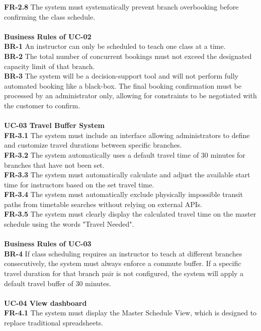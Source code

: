 \textbf{FR-2.8} The system must systematically prevent branch overbooking before confirming the class schedule. \\
\\
\textbf{Business Rules of UC-02} \\
\textbf{BR-1} An instructor can only be scheduled to teach one class at a time. \\
\textbf{BR-2} The total number of concurrent bookings must not exceed the designated capacity limit of that branch. \\
\textbf{BR-3} The system will be a decision-support tool and will not perform fully automated booking like a black-box. The final booking confirmation must be processed by an administrator only, allowing for constraints to be negotiated with the customer to confirm. \\
\\
\textbf{UC-03 Travel Buffer System} \\
\textbf{FR-3.1} The system must include an interface allowing administrators to define and customize travel durations between specific branches. \\
\textbf{FR-3.2} The system automatically uses a default travel time of 30 minutes for branches that have not been set. \\
\textbf{FR-3.3} The system must automatically calculate and adjust the available start time for instructors based on the set travel time. \\
\textbf{FR-3.4} The system must automatically exclude physically impossible transit paths from timetable searches without relying on external APIs. \\
\textbf{FR-3.5} The system must clearly display the calculated travel time on the master schedule using the words "Travel Needed". \\
\\
\textbf{Business Rules of UC-03} \\
\textbf{BR-4} If class scheduling requires an instructor to teach at different branches consecutively, the system must always enforce a commute buffer. If a specific travel duration for that branch pair is not configured, the system will apply a default travel buffer of 30 minutes. \\
\\
\textbf{UC-04 View dashboard} \\
\textbf{FR-4.1} The system must display the Master Schedule View, which is designed to replace traditional spreadsheets. \\
